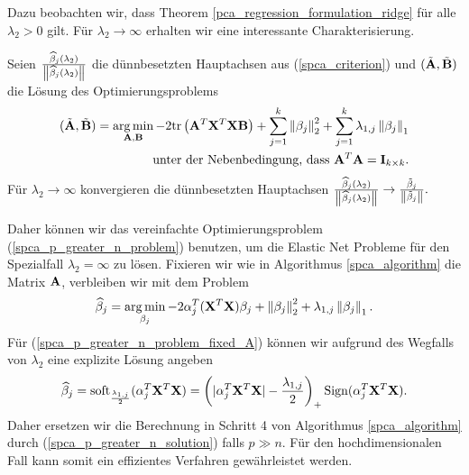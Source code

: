 Dazu beobachten wir, dass Theorem \ref{pca_regression_formulation_ridge} für alle $\lambda_2 > 0$ gilt. Für $\lambda_2 \to \infty$ erhalten wir eine interessante Charakterisierung.
\begin{thm} \label{spca_p_greater_n}
Seien $\frac{\widehat{\beta}_j(\lambda_2)}{\left\lVert \widehat{\beta}_j(\lambda_2) \right\rVert}$ die dünnbesetzten Hauptachsen aus (\ref{spca_criterion})
und $(\tilde{\mathbf{A}}, \tilde{\mathbf{B}})$ die Lösung des Optimierungsproblems
\begin{align}
\label{spca_p_greater_n_problem}
\begin{split}
(\tilde{\mathbf{A}}, \tilde{\mathbf{B}}) = \operatorname*{arg\,min}_{\mathbf{A}, \mathbf{B}} -2\text{tr} \left( \mathbf{A}^T\mathbf{X}^T\mathbf{X} \mathbf{B} \right) + \sum_{j=1}^k \left\lVert \beta_j \right\rVert_2^2 + \sum_{j=1}^k \lambda_{1,j}\left\lVert \beta_j \right\rVert_1\\
\text{unter der Nebenbedingung, dass } \mathbf{A}^T \mathbf{A} = \mathbf{I}_{k \times k}.
\end{split}
\end{align}
Für $\lambda_2 \to \infty$ konvergieren die dünnbesetzten Hauptachsen $\frac{\widehat{\beta}_j(\lambda_2)}{\left\lVert \widehat{\beta}_j(\lambda_2) \right\rVert} \to \frac{\tilde{\beta}_j}{\left\lVert \tilde{\beta}_j \right\rVert}.$
\end{thm}

Daher können wir das vereinfachte Optimierungsproblem (\ref{spca_p_greater_n_problem}) benutzen, um die Elastic Net Probleme für den Spezialfall $\lambda_2 = \infty$ zu lösen. Fixieren wir wie in Algorithmus \ref{spca_algorithm} die Matrix $\mathbf{A}$, verbleiben wir mit dem Problem
\begin{align}
\label{spca_p_greater_n_problem_fixed_A}
\widehat{\beta}_j = \operatorname*{arg\,min}_{\beta_j} -2 \alpha_j^T(\mathbf{X}^T\mathbf{X})\beta_j + \left\lVert \beta_j \right\rVert_{2}^{2} + \lambda_{1,j}\left\lVert \beta_j \right\rVert_1.
\end{align}
Für (\ref{spca_p_greater_n_problem_fixed_A}) können wir aufgrund des Wegfalls von $\lambda_2$ eine explizite Lösung angeben
\begin{align}
\label{spca_p_greater_n_solution}
\widehat{\beta}_j = \operatorname{soft}_{\frac{\lambda_{1,j}}{2}}(\alpha_j^T\mathbf{X}^T\mathbf{X}) = \left(|\alpha_j^T\mathbf{X}^T\mathbf{X}| - \frac{\lambda_{1,j}}{2}\right)_+ \operatorname{Sign}(\alpha_j^T\mathbf{X}^T\mathbf{X}).
\end{align}
Daher ersetzen wir die Berechnung in Schritt 4 von Algorithmus \ref{spca_algorithm} durch (\ref{spca_p_greater_n_solution}) falls $p \gg n$. Für den hochdimensionalen Fall kann somit ein effizientes Verfahren gewährleistet werden.

